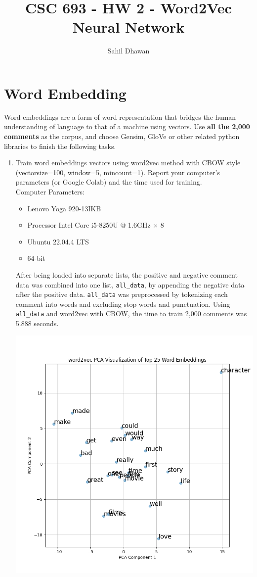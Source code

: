 \documentclass[conference]{IEEEtran}
\begin{document}
\onecolumn
\title{CSC 693 - HW 2 - Word2Vec Neural Network}
\author{Sahil Dhawan}
\maketitle
\section{Word Embedding}
\noindent Word embeddings are a form of word representation that bridges the human understanding of language to that of a machine using vectors. Use \textbf{all the 2,000 comments} as the corpus, and choose Gensim, GloVe or other related python libraries to finish the following tasks.
\begin{enumerate}
\item Train word embeddings vectors using word2vec method with CBOW style (vector\textunderscore size=100, window=5, min\textunderscore count=1). Report your computer’s parameters (or Google Colab) and the time used for training.\\
Computer Parameters:
\begin{itemize}
\item Lenovo Yoga 920-13IKB
\item Processor Intel Core i5-8250U @ 1.6GHz $\times$ 8
\item Ubuntu 22.04.4 LTS
\item 64-bit
\end{itemize}
After being loaded into separate lists, the positive and negative comment data was combined into one list, \verb"all_data", by appending the negative data after the positive data. \verb"all_data" was preprocessed by tokenizing each comment into words and excluding stop words and punctuation. Using \verb"all_data" and word2vec with CBOW, the time to train 2,000 comments was 5.888 seconds.\\
\begin{center}
\includegraphics[scale=0.35]{word2vec Top 25 Vectors.png}

\end{center}
\end{enumerate}
\end{document}
